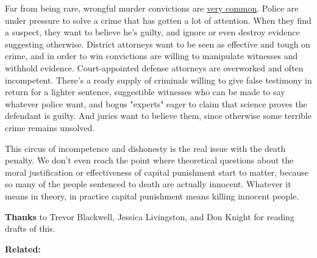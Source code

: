 Far from being rare,
                  wrongful murder convictions are
                  \href{https://deathpenaltyinfo.org/policy-issues/innocence/description-of-innocence-cases}{\underline{very common}}. Police are under pressure to solve a crime that has gotten
                  a lot of attention. When they find a suspect, they want to
                  believe he's guilty, and ignore or even destroy evidence
                  suggesting otherwise. District attorneys want to be seen as
                  effective and tough on crime, and in order to win convictions
                  are willing to manipulate witnesses and withhold evidence.
                  Court-appointed defense attorneys are overworked and often
                  incompetent. There's a ready supply of criminals willing to
                  give false testimony in return for a lighter sentence,
                  suggestible witnesses who can be made to say whatever police
                  want, and bogus "experts" eager to claim that science proves
                  the defendant is guilty. And juries want to believe them,
                  since otherwise some terrible crime remains unsolved.

This
                  circus of incompetence and dishonesty is the real issue with
                  the death penalty. We don't even reach the point where
                  theoretical questions about the moral justification or
                  effectiveness of capital punishment start to matter, because
                  so many of the people sentenced to death are actually
                  innocent. Whatever it means in theory, in practice capital
                  punishment means killing innocent people.








                  \textbf{Thanks} to Trevor Blackwell, Jessica Livingston, and Don
                  Knight for reading drafts of this.



\textbf{Related:}


              
            
          
